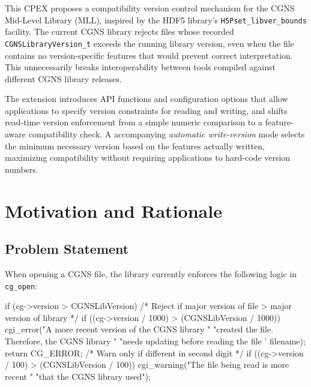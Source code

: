 \documentclass[11pt,letterpaper]{article}
\makeatletter
\let\cgns@orig@lstlisting\lstlisting
\let\cgns@endorig@lstlisting\endlstlisting
\renewenvironment{lstlisting}
  {\par\needspace{5\baselineskip}\nolinenumbers\cgns@orig@lstlisting}
  {\cgns@endorig@lstlisting\par\linenumbers}
\makeatother
\begin{document}
This CPEX proposes a compatibility version control mechanism for the CGNS
Mid-Level Library (MLL), inspired by the HDF5 library's
\texttt{H5Pset\_libver\_bounds} facility.  The current CGNS library
rejects files whose recorded \texttt{CGNSLibraryVersion\_t} exceeds the
running library version, even when the file contains no
version-specific features that would prevent correct interpretation.
This unnecessarily breaks interoperability between tools compiled
against different CGNS library releases.

The extension introduces API functions and configuration options that
allow applications to specify version constraints for reading and
writing, and shifts read-time version enforcement from a simple
numeric comparison to a feature-aware compatibility check.  A
accompanying \emph{automatic write-version} mode selects the minimum
necessary version based on the features actually written, maximizing
compatibility without requiring applications to hard-code version
numbers.

\section{Motivation and Rationale}

\subsection{Problem Statement}

When opening a CGNS file, the library currently enforces the following
logic in \texttt{cg\_open}:

\begin{lstlisting}[language=C]
if (cg->version > CGNSLibVersion) {
    /* Reject if major version of file > major version of library */
    if ((cg->version / 1000) > (CGNSLibVersion / 1000)) {
        cgi_error("A more recent version of the CGNS library "
                  "created the file. Therefore, the CGNS library "
                  "needs updating before reading the file '%s'.",
                  filename);
        return CG_ERROR;
    }
    /* Warn only if different in second digit */
    if ((cg->version / 100) > (CGNSLibVersion / 100)) {
        cgi_warning("The file being read is more recent "
                    "that the CGNS library used");
    }
}
\end{lstlisting}
\end{document}
